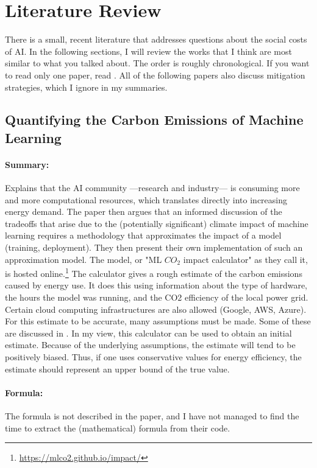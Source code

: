 
\section{Literature Review}

There is a small, recent literature that addresses questions about the social costs of
AI. In the following sections, I will review the works that I think are most similar to
what you talked about. The order is roughly chronological. If you want to read only one
paper, read . All of the following papers also discuss mitigation
strategies, which I ignore in my summaries.


\subsection{Quantifying the Carbon Emissions of Machine Learning}
\centerline{}
\vspace{1em}

\paragraph{Summary:} Explains that the AI community ---research and industry--- is
consuming more and more computational resources, which translates directly into
increasing energy demand. The paper then argues that an informed discussion of the
tradeoffs that arise due to the (potentially significant) climate impact of machine
learning requires a methodology that approximates the impact of a model (training,
deployment). They then present their own implementation of such an approximation model.
The model, or "ML $CO_2$ impact calculator" as they call it, is hosted
online.\footnote{\url{https://mlco2.github.io/impact/}} The calculator gives a rough
estimate of the carbon emissions caused by energy use.  It does this using information
about the type of hardware, the hours the model was running, and the CO2 efficiency of
the local power grid. Certain cloud computing infrastructures are also allowed (Google,
AWS, Azure). For this estimate to be accurate, many assumptions must be made. Some of
these are discussed in . In my view, this calculator can be
used to obtain an initial estimate. Because of the underlying assumptions, the estimate
will tend to be positively biased. Thus, if one uses conservative values for energy
efficiency, the estimate should represent an upper bound of the true value.

\paragraph{Formula:} The formula is not described in the paper, and I have not managed
to find the time to extract the (mathematical) formula from their code.

